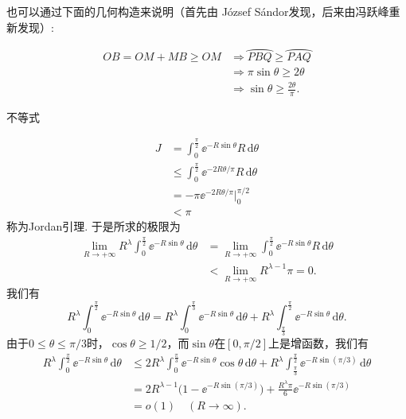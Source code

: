 \begin{ans}
  也可以通过下面的几何构造来说明（首先由 J\'ozsef S\'andor发现，后来由冯跃峰重新发现）:
  \begin{figure}[!ht]
    \centering
    \caption{\label{geo}}
  \end{figure}
  \begin{align*}
    OB = OM + MB \ge OM
    & \Rightarrow \wideparen{PBQ} \ge \wideparen{PAQ}\\
    & \Rightarrow \pi\sin\theta \ge 2\theta\\
    & \Rightarrow \sin\theta \ge \frac{2\theta}\pi.
  \end{align*}
  \begin{enumb}\setcounter{enumi}{1}
    \item \method 不等式
  \end{enumb}
    \begin{align*}
      J & = \int_0^{\frac\pi2}\ee^{-R\sin\theta}R\,\mathrm d\theta\\
        & \le \int_0^{\frac\pi2}\ee^{-2R\theta/\pi}R\,\mathrm d\theta\\
        & = -\pi\ee^{-2R\theta/\pi}\Big|_0^{\pi/2}\\
        & <\pi
    \end{align*}
    称为Jordan引理. 于是所求的极限为
    \begin{align*}
      \lim_{R\to+\infty}R^\lambda\int_0^{\frac\pi2}
      \ee^{-R\sin\theta}\,\mathrm d\theta
      & = \lim_{R\to+\infty}\int_0^{\frac\pi2}
      \ee^{-R\sin\theta}R\,\mathrm d\theta\\
      & <\lim_{R\to+\infty}R^{\lambda-1}\pi = 0.
    \end{align*}
    \method 我们有
    \[
      R^\lambda\int_0^{\frac\pi2}
      \ee^{-R\sin\theta}\,\mathrm d\theta =
      R^\lambda\int_0^{\frac\pi3}
      \ee^{-R\sin\theta}\,\mathrm d\theta +
      R^\lambda\int_{\frac\pi3}^{\frac\pi2}
      \ee^{-R\sin\theta}\,\mathrm d\theta.
    \]
    由于$0\le\theta\le\pi/3$时，$\cos\theta\ge1/2$，而$\sin\theta$在$[0,\pi/2]$上是增函数，我们有
    \begin{align*}
      R^\lambda\int_0^{\frac\pi2}
      \ee^{-R\sin\theta}\,\mathrm d\theta
      & \le 2R^\lambda\int_0^{\frac\pi3}
      \ee^{-R\sin\theta}\cos\theta\,\mathrm d\theta
      + R^\lambda\int_{\frac\pi3}^{\frac\pi2}
      \ee^{-R\sin(\pi/3)}\,\mathrm d\theta\\
      & = 2R^{\lambda-1}\Big( 1-\ee^{-R\sin(\pi/3)} \Big)
      + \frac{R^\lambda\pi}6\ee^{-R\sin(\pi/3)}\\
      & = o(1)\quad (R\to\infty).
    \end{align*}
\end{ans}

